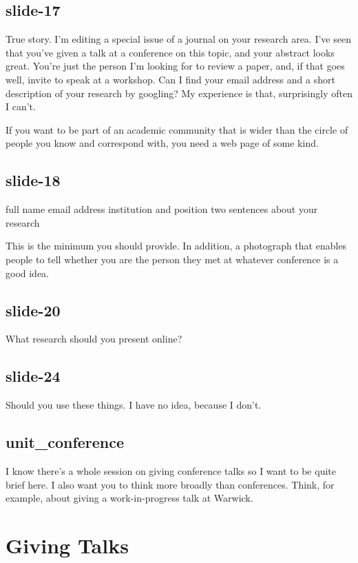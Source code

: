 \documentclass[12pt,\papersize]{extarticle}
\begin{document}
\subsection{slide-17}
True story.  I'm editing a special issue of a journal on your research area.
I've seen that you've given a talk at a conference on this topic, and your abstract looks great.
You're just the person I'm looking for to review a paper, and, if that goes well, invite to speak
at a workshop.
Can I find your email address and a short description of your research by googling?
My experience is that, surprisingly often I can't.
 
If you want to be part of an academic community that is wider than the circle of people you know 
and correspond with, you need a web page of some kind.
 
\subsection{slide-18}
full name
email address
institution and position
two sentences about your research
 
This is the minimum you should provide.  
In addition, a photograph that enables people to tell whether you are the person they
met at whatever conference is a good idea.
 
\subsection{slide-20}
What research should you present online?
 
\subsection{slide-24}
Should you use these things.  I have no idea, because I don't.
 
\subsection{unit\_conference}
I know there's a whole session on giving conference talks so I want to be quite brief here.  I also want you to think more broadly than conferences.  Think, for example, about giving a work-in-progress talk at Warwick.
 
 
 
\section{Giving Talks}
 
\end{document}
